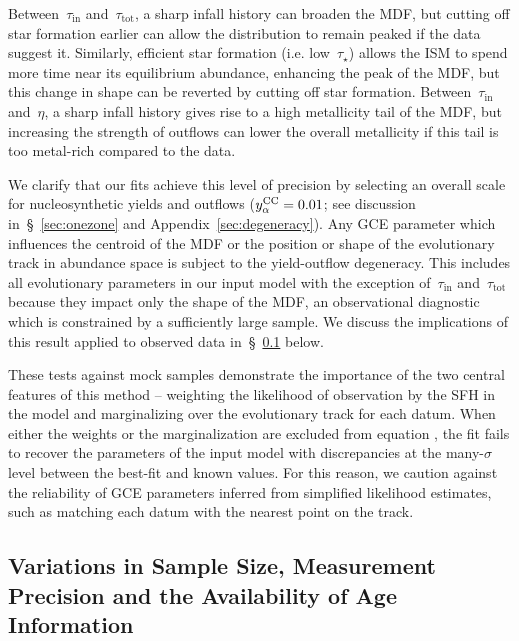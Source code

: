 \documentclass[ms.tex]{subfiles}
\begin{document}
Between~$\tau_\text{in}$ and~$\tau_\text{tot}$, a sharp infall history can
broaden the MDF, but cutting off star formation earlier can allow the
distribution to remain peaked if the data suggest it.
Similarly, efficient star formation (i.e. low~$\tau_\star$) allows the ISM to
spend more time near its equilibrium abundance, enhancing the peak of the MDF,
but this change in shape can be reverted by cutting off star formation.
Between~$\tau_\text{in}$ and~$\eta$, a sharp infall history gives rise to a
high metallicity tail of the MDF, but increasing the strength of outflows
can lower the overall metallicity if this tail is too metal-rich compared to
the data.
\par
We clarify that our fits achieve this level of precision by selecting an
overall scale for nucleosynthetic yields and outflows ($y_\alpha^\text{CC} = 0.01$; see
discussion in~\S~\ref{sec:onezone} and Appendix~\ref{sec:degeneracy}).
Any GCE parameter which influences the centroid of the MDF or the position or
shape of the evolutionary track in abundance space is subject to the
yield-outflow degeneracy.
This includes all evolutionary parameters in our input model with the exception
of~$\tau_\text{in}$ and~$\tau_\text{tot}$ because they impact only the shape of
the MDF, an observational diagnostic which is constrained by a sufficiently
large sample.
We discuss the implications of this result applied to observed data
in~\S~\ref{sec:mocks:variations} below.
\par
These tests against mock samples demonstrate the importance of the two central
features of this method -- weighting the likelihood of observation by the SFH
in the model and marginalizing over the evolutionary track for each datum.
When either the weights or the marginalization are excluded from equation
, the fit fails to recover the parameters of the input
model with discrepancies at the many-$\sigma$ level between the best-fit and
known values.
For this reason, we caution against the reliability of GCE parameters inferred
from simplified likelihood estimates, such as matching each datum with the
nearest point on the track.

\subsection{Variations in Sample Size, Measurement Precision and the
Availability of Age Information}
\label{sec:mocks:variations}


\end{document}

